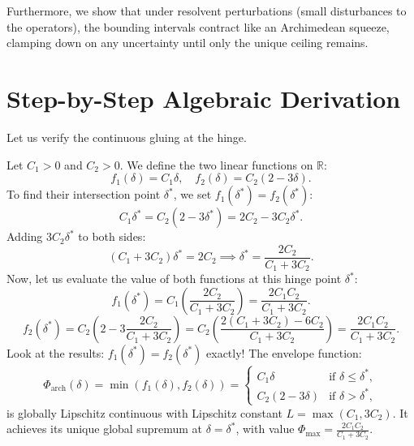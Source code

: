 \documentclass[11pt,a4paper]{article}
\theoremstyle{definition}
\begin{document}
Furthermore, we show that under resolvent perturbations (small disturbances to the operators), the bounding intervals contract like an Archimedean squeeze, clamping down on any uncertainty until only the unique ceiling remains.


\section{Step-by-Step Algebraic Derivation}

Let us verify the continuous gluing at the hinge.

Let $C_1 > 0$ and $C_2 > 0$. We define the two linear functions on $\mathbb{R}$:
\begin{equation}
f_1(\delta) = C_1 \delta, \quad f_2(\delta) = C_2(2 - 3\delta).
\end{equation}
To find their intersection point $\delta^*$, we set $f_1(\delta^*) = f_2(\delta^*)$:
\begin{equation}
C_1 \delta^* = C_2(2 - 3\delta^*) = 2C_2 - 3C_2 \delta^*.
\end{equation}
Adding $3C_2 \delta^*$ to both sides:
\begin{equation}
(C_1 + 3C_2)\delta^* = 2C_2 \implies \delta^* = \frac{2C_2}{C_1 + 3C_2}.
\end{equation}
Now, let us evaluate the value of both functions at this hinge point $\delta^*$:
\begin{equation}
f_1(\delta^*) = C_1 \left( \frac{2C_2}{C_1 + 3C_2} \right) = \frac{2C_1 C_2}{C_1 + 3C_2}.
\end{equation}
\begin{equation}
f_2(\delta^*) = C_2 \left( 2 - 3 \frac{2C_2}{C_1 + 3C_2} \right) = C_2 \left( \frac{2(C_1 + 3C_2) - 6C_2}{C_1 + 3C_2} \right) = \frac{2C_1 C_2}{C_1 + 3C_2}.
\end{equation}
Look at the results: $f_1(\delta^*) = f_2(\delta^*)$ exactly!
The envelope function:
\begin{equation}
\Phi_{\mathrm{arch}}(\delta) = \min(f_1(\delta), f_2(\delta)) = \begin{cases} C_1 \delta & \text{if } \delta \le \delta^*, \\ C_2(2 - 3\delta) & \text{if } \delta > \delta^*, \end{cases}
\end{equation}
is globally Lipschitz continuous with Lipschitz constant $L = \max(C_1, 3C_2)$. It achieves its unique global supremum at $\delta = \delta^*$, with value $\Phi_{\max} = \frac{2C_1 C_2}{C_1 + 3C_2}$.
\end{document}
